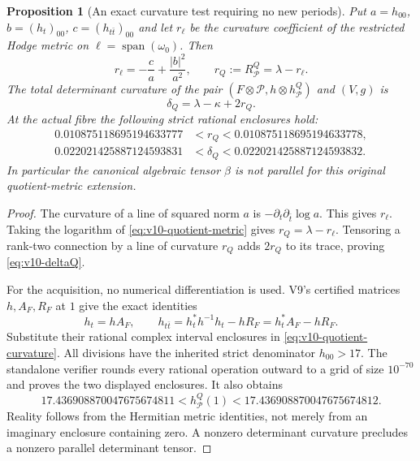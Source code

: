 \documentclass[11pt]{article}
\newtheorem{proposition}[proposition]{Proposition}
\theoremstyle{definition}
\theoremstyle{remark}
\newcommand{\Span}{\operatorname{span}}
\begin{document}
\begin{proposition}[An exact curvature test requiring no new periods]
\label{prop:v10-quotient-curvature}
Put $a=h_{00}$, $b=(h_t)_{00}$, $c=(h_{t\bar t})_{00}$ and let
$r_\ell$ be the curvature coefficient of the restricted Hodge metric on
$\ell=\Span(\omega_0)$. Then
\begin{equation}
 \boxed{r_\ell=-\frac ca+\frac{|b|^2}{a^2},\qquad
 r_Q:=R_{\mathscr P}^{Q}=\lambda-r_\ell.}
 \label{eq:v10-quotient-curvature}
\end{equation}
The total determinant curvature of the pair
$(F\otimes\mathscr P,h\otimes h_{\mathscr P}^{Q})$ and $(V,g)$ is
\begin{equation}
 \boxed{\delta_Q=\lambda-\kappa+2r_Q.}
 \label{eq:v10-deltaQ}
\end{equation}
At the actual fibre the following strict rational enclosures hold:
\begin{align}
 0.010875118695194633777&<r_Q<0.010875118695194633778,
       \label{eq:v10-rQ-number}\\
 0.022021425887124593831&<\delta_Q<0.022021425887124593832.
       \label{eq:v10-deltaQ-number}
\end{align}
In particular the canonical algebraic tensor $\beta$ is not parallel for
this original quotient-metric extension.
\end{proposition}
\begin{proof}
The curvature of a line of squared norm $a$ is
$-\partial_t\partial_{\bar t}\log a$. This gives $r_\ell$.
Taking the logarithm of \cref{eq:v10-quotient-metric} gives
$r_Q=\lambda-r_\ell$. Tensoring a rank-two connection by a line of
curvature $r_Q$ adds $2r_Q$ to its trace, proving \cref{eq:v10-deltaQ}.

For the acquisition, no numerical differentiation is used. V9's certified
matrices $h,A_F,R_F$ at $1$ give the exact identities
\[
 h_t=hA_F,\qquad
 h_{t\bar t}=h_t^*h^{-1}h_t-hR_F=h_t^*A_F-hR_F.
\]
Substitute their rational complex interval enclosures in
\cref{eq:v10-quotient-curvature}. All divisions have the inherited
strict denominator $h_{00}>17$. The standalone verifier rounds every
rational operation outward to a grid of size $10^{-70}$ and proves the
two displayed enclosures. It also obtains
\[
 17.436908870047675674811<h_{\mathscr P}^{Q}(1)
 <17.436908870047675674812.
\]
Reality follows from the Hermitian metric identities, not merely from
an imaginary enclosure containing zero. A nonzero determinant curvature
precludes a nonzero parallel determinant tensor.
\end{proof}
\end{document}
